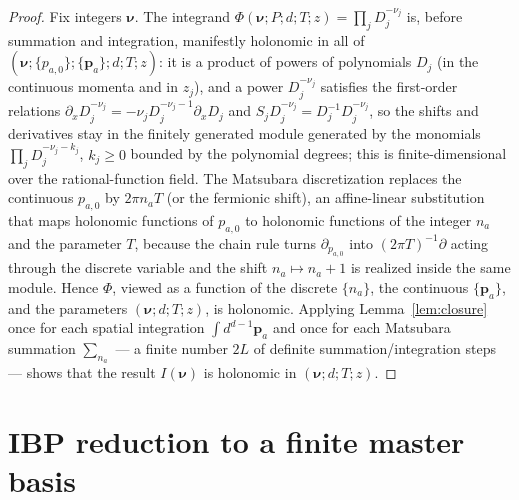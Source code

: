 \documentclass{amsart}
\theoremstyle{definition}
\begin{document}
\begin{proof}
Fix integers $\boldsymbol\nu$. The integrand
$\Phi(\boldsymbol\nu;P;d;T;z)=\prod_j D_j^{-\nu_j}$ is, before summation and
integration, manifestly holonomic in all of
$(\boldsymbol\nu;\{p_{a,0}\};\{\mathbf p_a\};d;T;z)$: it is a product of
powers of polynomials $D_j$ (in the continuous momenta and in $z_j$), and a
power $D_j^{-\nu_j}$ satisfies the first-order relations
$\partial_{x}D_j^{-\nu_j}=-\nu_j D_j^{-\nu_j-1}\partial_x D_j$ and
$S_j D_j^{-\nu_j}=D_j^{-1}D_j^{-\nu_j}$, so the shifts and derivatives stay in
the finitely generated module generated by the monomials
$\prod_j D_j^{-\nu_j-k_j}$, $k_j\geq0$ bounded by the polynomial degrees; this
is finite-dimensional over the rational-function field. The Matsubara
discretization replaces the continuous $p_{a,0}$ by $2\pi n_a T$ (or the
fermionic shift), an affine-linear substitution that maps holonomic functions
of $p_{a,0}$ to holonomic functions of the integer $n_a$ and the parameter
$T$, because the chain rule turns $\partial_{p_{a,0}}$ into
$(2\pi T)^{-1}\partial$ acting through the discrete variable and the shift
$n_a\mapsto n_a+1$ is realized inside the same module. Hence $\Phi$, viewed as
a function of the discrete $\{n_a\}$, the continuous $\{\mathbf p_a\}$, and the
parameters $(\boldsymbol\nu;d;T;z)$, is holonomic. Applying
Lemma~\ref{lem:closure} once for each spatial integration
$\int d^{d-1}\mathbf p_a$ and once for each Matsubara summation $\sum_{n_a}$
--- a finite number $2L$ of definite summation/integration steps --- shows that
the result $I(\boldsymbol\nu)$ is holonomic in $(\boldsymbol\nu;d;T;z)$.
\end{proof}

\section{IBP reduction to a finite master basis}
\end{document}
